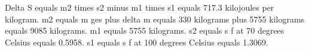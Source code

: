 Delta S equals m2 times s2 minus m1 times s1 equals 717.3 kilojoules per kilogram.  
m2 equals m ges plus delta m equals 330 kilograms plus 5755 kilograms equals 9085 kilograms.  
m1 equals 5755 kilograms.  
s2 equals s f at 70 degrees Celsius equals 0.5958.  
s1 equals s f at 100 degrees Celsius equals 1.3069.